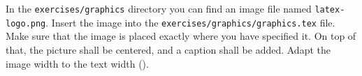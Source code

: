 In the \texttt{exercises/graphics} directory you can find an image file named \texttt{latex-logo.png}. Insert the image into the \texttt{exercises/graphics/graphics.tex} file. Make sure that the image is placed exactly where you have specified it. On top of that, the picture shall be centered, and a caption shall be added. Adapt the image width to the text width (\texttt{\textwidth}).


